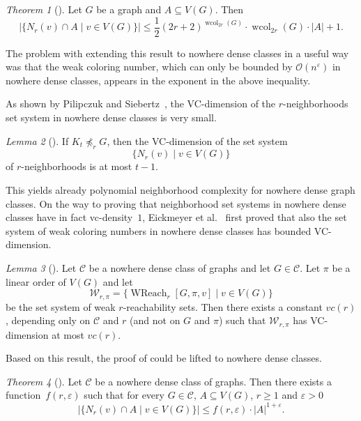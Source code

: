 \documentclass[1p,number,a4paper]{elsarticle}
\theoremstyle{remark}
\newcommand{\Oof}{\mathcal{O}}
\newcommand{\Cc}{\mathscr{C}}
\newcommand{\minor}{\preccurlyeq}
\renewcommand{\epsilon}{\varepsilon}
\DeclareMathOperator{\wcol}{wcol}
\DeclareMathOperator{\WReach}{WReach}
\newtheorem{theorem}{Theorem}[section]
\newtheorem{lemma}[theorem]{Lemma}
\begin{document}
\begin{theorem}[\cite{reidl2019characterising}]\label{thm:reidl}
    Let $G$ be a graph and $A\subseteq V(G)$. Then \[|\{N_r(v)\cap A \mid v\in V(G)\}|\leq \frac{1}{2}(2r+2)^{\wcol_{2r}(G)}\cdot \wcol_{2r}(G)\cdot |A|+1.\] 
\end{theorem}

The problem with extending this result to nowhere dense classes in a useful way was that the weak coloring number, which can only be bounded by $\Oof(n^\epsilon)$ in nowhere dense classes, appears in the exponent in the above inequality. 

As shown by Pilipczuk and Siebertz~\cite{pilipczuk2021kernelization}, the VC-dimension of the $r$-neighborhoods set system in nowhere dense classes is very small. 

\begin{lemma}[\cite{pilipczuk2021kernelization}]
    If $K_t\not\minor_r G$, then the VC-dimension of the set system \[\{N_r(v)\mid v\in V(G)\}\]
    of $r$-neighborhoods is at most $t-1$. 
\end{lemma}

This yields already polynomial neighborhood complexity for nowhere dense graph classes. 
On the way to proving that neighborhood set systems in nowhere dense classes have in fact vc-density~$1$, Eickmeyer et al.~\cite{EickmeyerGKKPRS17} first proved that also the set system of weak coloring numbers in nowhere dense classes has bounded VC-dimension. 

\begin{lemma}[\cite{EickmeyerGKKPRS17}]\label{lem:eickmeiyer}
    Let $\Cc$ be a nowhere dense class of graphs and let $G\in \Cc$. Let $\pi$ be a linear order of $V(G)$ and let 
    \[\mathcal{W}_{r,\pi}=\{\WReach_r[G,\pi,v]\mid v\in V(G)\}\]
    be the set system of weak $r$-reachability sets. 
    Then there exists a constant $vc(r)$, depending only on $\Cc$ and $r$ (and not on $G$ and $\pi$) such that $\mathcal{W}_{r,\pi}$ has VC-dimension at most $vc(r)$. 
\end{lemma}

Based on this result, the proof of  could be lifted to nowhere dense classes. 

\begin{theorem}[\cite{EickmeyerGKKPRS17}]
    Let $\Cc$ be a nowhere dense class of graphs. Then there exists a function~$f(r,\epsilon)$ such that for every $G\in \Cc$, $A\subseteq V(G)$, $r\geq 1$ and $\epsilon>0$ 
    \[|\{N_r(v)\cap A \mid v\in V(G)\}|\leq f(r,\epsilon)\cdot |A|^{1+\epsilon}.\]
\end{theorem}
\end{document}
